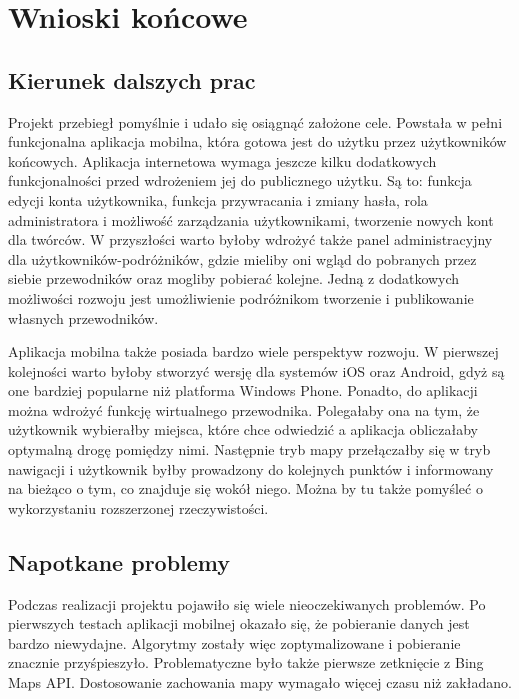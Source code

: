 \documentclass[a4paper]{book}
\begin{document}
	\chapter{Wnioski końcowe}
	\label{id:cha:wnioski_koncowe}
	
	
	\section{Kierunek dalszych prac}
	
	Projekt przebiegł pomyślnie i udało się osiągnąć założone cele. Powstała w pełni funkcjonalna aplikacja mobilna, która gotowa jest do użytku przez użytkowników końcowych. Aplikacja internetowa wymaga jeszcze kilku dodatkowych funkcjonalności przed wdrożeniem jej do publicznego użytku. Są to: funkcja edycji konta użytkownika, funkcja przywracania i zmiany hasła, rola administratora i możliwość zarządzania użytkownikami, tworzenie nowych kont dla twórców. W przyszłości warto byłoby wdrożyć także panel administracyjny dla użytkowników-podróżników, gdzie mieliby oni wgląd do pobranych przez siebie przewodników oraz mogliby pobierać kolejne. Jedną z dodatkowych możliwości rozwoju jest umożliwienie podróżnikom tworzenie i publikowanie własnych przewodników.
	
	Aplikacja mobilna także posiada bardzo wiele perspektyw rozwoju. W pierwszej kolejności warto byłoby stworzyć wersję dla systemów iOS oraz Android, gdyż są one bardziej popularne niż platforma Windows Phone. Ponadto, do aplikacji można wdrożyć funkcję wirtualnego przewodnika. Polegałaby ona na tym, że użytkownik wybierałby miejsca, które chce odwiedzić a aplikacja obliczałaby optymalną drogę pomiędzy nimi. Następnie tryb mapy przełączałby się w tryb nawigacji i użytkownik byłby prowadzony do kolejnych punktów i informowany na bieżąco o tym, co znajduje się wokół niego. Można by tu także pomyśleć o wykorzystaniu rozszerzonej rzeczywistości. 
	
	\section{Napotkane problemy}
	
	Podczas realizacji projektu pojawiło się wiele nieoczekiwanych problemów. Po pierwszych testach aplikacji mobilnej okazało się, że pobieranie danych jest bardzo niewydajne. Algorytmy zostały więc zoptymalizowane i pobieranie znacznie przyśpieszyło. Problematyczne było także pierwsze zetknięcie z Bing Maps API. Dostosowanie zachowania mapy wymagało więcej czasu niż zakładano. 
	
\end{document}
